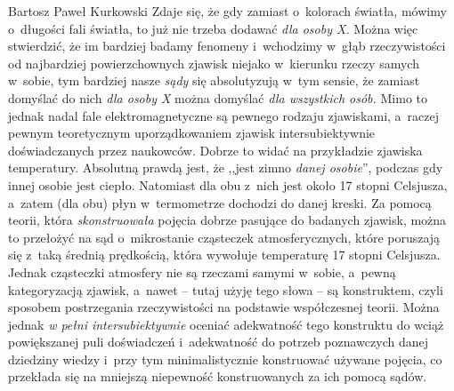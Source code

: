\begin{artplenv}{Bartosz Paweł Kurkowski}
Zdaje się, że gdy zamiast o~kolorach światła, mówimy o~długości fali światła, to już nie trzeba dodawać \textit{dla
osoby X.} Można więc stwierdzić, że im bardziej badamy fenomeny i~wchodzimy w~głąb rzeczywistości od najbardziej
powierzchownych zjawisk niejako w~kierunku rzeczy samych w~sobie, tym bardziej nasze \textit{sądy} się
absolutyzują w~tym sensie, że zamiast  domyślać do nich \textit{dla osoby X} można domyślać \textit{dla wszystkich osób.}
Mimo to jednak nadal fale elektromagnetyczne są pewnego rodzaju zjawiskami, a~raczej pewnym teoretycznym
uporządkowaniem zjawisk intersubiektywnie doświadczanych przez naukowców. Dobrze to widać na przykładzie zjawiska
temperatury. Absolutną prawdą jest, że ,,jest zimno \textit{danej osobie}'', podczas gdy innej osobie jest ciepło.
Natomiast dla obu z~nich jest około 17 stopni Celsjusza, a~zatem (dla obu) płyn w~termometrze dochodzi do danej kreski.
Za pomocą teorii, która \textit{skonstruowała} pojęcia dobrze pasujące do badanych zjawisk, można to przełożyć
na sąd o~mikrostanie cząsteczek atmosferycznych, które poruszają się z~taką średnią prędkością, która wywołuje
temperaturę 17 stopni Celsjusza. Jednak cząsteczki atmosfery nie są rzeczami samymi w~sobie, a~pewną kategoryzacją
zjawisk, a~nawet -- tutaj użyję tego słowa -- są konstruktem, czyli sposobem postrzegania rzeczywistości na
podstawie współczesnej teorii.
Można jednak \textit{w pełni intersubiektywnie }oceniać adekwatność tego konstruktu do wciąż powiększanej puli
doświadczeń i~adekwatność do potrzeb poznawczych danej dziedziny wiedzy
\parencite[s.~95]{grobler_prawda_2000}
i~przy tym minimalistycznie konstruować używane pojęcia, co przekłada się na mniejszą niepewność konstruowanych za ich
pomocą sądów.



\end{artplenv}
